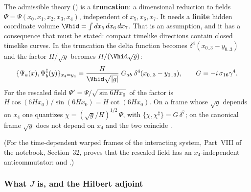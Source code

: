 The admissible theory () is a \textbf{truncation}: a dimensional reduction to fields
$\Psi=\Psi(x_0,x_1,x_2,x_3,x_4)$, independent of $x_5,x_6,x_7$. It needs a \textbf{finite} hidden
coordinate volume $\Vhid=\int dx_5\,dx_6\,dx_7$. That is an assumption, and it has a consequence that
must be stated: compact timelike directions contain closed timelike curves. In the truncation the
delta function becomes $\delta^4(x_{0..3}-y_{0..3})$ and the factor $H/\sqrt g$ becomes
$H/(\Vhid\sqrt g)$:
\[
  \{\Psi_a(x),\Psi^{\ddagger}_b(y)\}_{x_4=y_4}=\frac{H}{\Vhid\sqrt{|g|}}\;G_{ab}\;\delta^4(x_{0..3}-y_{0..3}),
  \qquad G=-i\,\sigma_{16}\gamma^4 .
\]
For the rescaled field $\Psi'=\Psi/\sqrt{\sin 6Hx_0}$ of  the factor is
$H\cos(6Hx_0)/\sin(6Hx_0)=H\cot(6Hx_0)$. On a frame whose $\sqrt g$ depends on $x_4$ one quantizes
$\chi=(\sqrt g/H)^{1/2}\,\Psi$, with $\{\chi,\chi^{\ddagger}\}=G\,\delta^7$; on the canonical frame
$\sqrt g$ does not depend on $x_4$ and the two coincide . 

(For the time-dependent warped frames of the interacting system, Part~VIII of the notebook,
Section~32, proves that the rescaled field has an $x_4$-independent anticommutator:
 and .)

\subsubsection{What \texorpdfstring{$J$}{J} is, and the Hilbert adjoint}
\label{sec:3.5.5}

